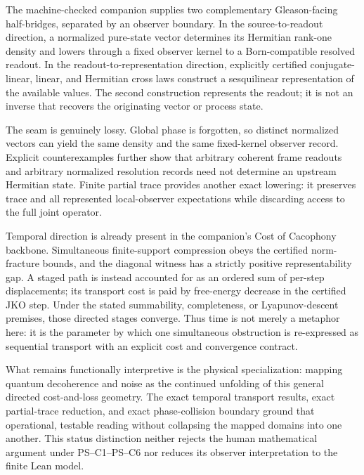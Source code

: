 \begin{remark}
\label{remark:appC_observer_lowering_boundary}
The machine-checked companion supplies two complementary Gleason-facing
half-bridges, separated by an observer boundary.  In the source-to-readout direction,
a normalized pure-state vector determines its Hermitian rank-one density and lowers
through a fixed observer kernel to a Born-compatible resolved readout.  In the
readout-to-representation direction, explicitly certified conjugate-linear, linear,
and Hermitian cross laws construct a sesquilinear representation of the available
values.  The second construction represents the readout; it is not an inverse that
recovers the originating vector or process state.

The seam is genuinely lossy.  Global phase is forgotten, so distinct normalized
vectors can yield the same density and the same fixed-kernel observer record.
Explicit counterexamples further show that arbitrary coherent frame readouts and
arbitrary normalized resolution records need not determine an upstream Hermitian
state.  Finite partial trace provides another exact lowering: it preserves trace and
all represented local-observer expectations while discarding access to the full joint
operator.

Temporal direction is already present in the companion's Cost of Cacophony backbone.
Simultaneous finite-support compression obeys the certified norm-fracture bounds, and
the diagonal witness has a strictly positive representability gap.  A staged path is
instead accounted for as an ordered sum of per-step displacements; its transport cost
is paid by free-energy decrease in the certified JKO step.  Under the stated
summability, completeness, or Lyapunov-descent premises, those directed stages
converge.  Thus time is not merely a metaphor here: it is the parameter by which one
simultaneous obstruction is re-expressed as sequential transport with an explicit cost
and convergence contract.

What remains functionally interpretive is the physical specialization: mapping quantum decoherence
and noise as the continued unfolding of this general directed cost-and-loss geometry.
The exact temporal transport results, exact partial-trace reduction, and exact
phase-collision boundary ground that operational, testable reading without collapsing the mapped domains into one another.
This status distinction neither rejects the human mathematical argument under
PS--C1--PS--C6 nor reduces its observer interpretation to the finite Lean model.
\end{remark}

